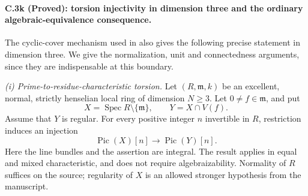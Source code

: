 \paragraph{C.3k (Proved): torsion injectivity in dimension three and the ordinary algebraic-equivalence consequence.}
The cyclic-cover mechanism used in
\citet[Section 2.5, p.~466]{D_Kollar2016LocalPicard}
also gives the following precise statement in dimension
three. We give the normalization, unit and connectedness
arguments, since they are indispensable at this boundary.

\emph{(i) Prime-to-residue-characteristic torsion.}
Let $(R,\mathfrak m,k)$ be an excellent, normal, strictly
henselian local ring of dimension $N\ge3$. Let
$0\ne f\in\mathfrak m$, and put
\[
 X=\operatorname{Spec}R\setminus\{\mathfrak m\},
 \qquad Y=X\cap V(f).
\]
Assume that $Y$ is regular. For every positive integer
$n$ invertible in $R$, restriction induces an injection
\begin{equation}\label{eq:C3-prime-to-p-Pic-injection}
              \operatorname{Pic}(X)[n]
                    \longrightarrow\operatorname{Pic}(Y)[n].
\end{equation}
Here the line bundles and the assertion are integral.
The result applies in equal and mixed characteristic,
and does not require algebraizability. Normality of
$R$ suffices on the source; regularity of $X$ is an
allowed stronger hypothesis from the manuscript.

